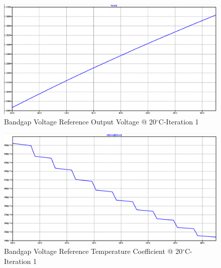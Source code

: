 \documentclass[conference]{IEEEtran}
\begin{document}
\begin{figure}[!htbp]
  	\centering
  	\includegraphics[scale=0.35]{images/appendix/bg1-vref.png}
  	\caption[output-z-meas]{Bandgap Voltage Reference Output Voltage @ 20$^{\circ}$C-Iteration 1}
  	\label{fig:bg1-vref}
	\end{figure}
\begin{figure}[!htbp]
  	\centering
  	\includegraphics[scale=0.35]{images/appendix/bg1-tempco.png}
  	\caption[output-z-meas]{Bandgap Voltage Reference Temperature Coefficient @ 20$^{\circ}$C-Iteration 1}
  	\label{fig:bg1-tempco}
	\end{figure}
\end{document}
